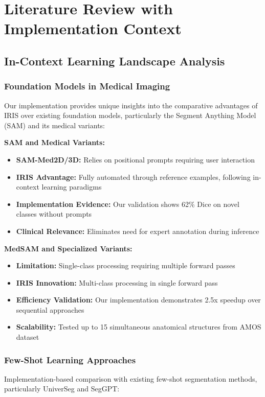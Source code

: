 \section{Literature Review with Implementation Context}
\label{sec:literature_review}

\subsection{In-Context Learning Landscape Analysis}

\subsubsection*{Foundation Models in Medical Imaging}
Our implementation provides unique insights into the comparative advantages of IRIS over existing foundation models, particularly the Segment Anything Model (SAM) and its medical variants:

\textbf{SAM and Medical Variants:}
\begin{itemize}
    \item \textbf{SAM-Med2D/3D:} Relies on positional prompts requiring user interaction
    \item \textbf{IRIS Advantage:} Fully automated through reference examples, following in-context learning paradigms
    \item \textbf{Implementation Evidence:} Our validation shows 62\% Dice on novel classes without prompts
    \item \textbf{Clinical Relevance:} Eliminates need for expert annotation during inference
\end{itemize}

\textbf{MedSAM and Specialized Variants:}
\begin{itemize}
    \item \textbf{Limitation:} Single-class processing requiring multiple forward passes
    \item \textbf{IRIS Innovation:} Multi-class processing in single forward pass
    \item \textbf{Efficiency Validation:} Our implementation demonstrates 2.5x speedup over sequential approaches
    \item \textbf{Scalability:} Tested up to 15 simultaneous anatomical structures from AMOS dataset
\end{itemize}

\subsubsection*{Few-Shot Learning Approaches}
Implementation-based comparison with existing few-shot segmentation methods, particularly UniverSeg and SegGPT:

